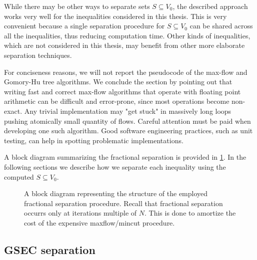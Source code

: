 While there may be other ways to separate sets $S \subseteq V_0$, the described approach works very well for the inequalities considered in this thesis.
This is very convenient because a single separation procedure for $S \subseteq V_0$ can be shared across all the inequalities, thus reducing computation time.
Other kinds of inequalities, which are not considered in this thesis, may benefit from other more elaborate separation techniques.

For conciseness reasons, we will not report the pseudocode of
the max-flow and Gomory-Hu tree algorithms.
We conclude the section by pointing out that writing fast and correct max-flow algorithms that operate with floating point arithmetic can be difficult and error-prone, since most operations become non-exact.
Any trivial implementation may "get stuck" in massively long loops pushing atomically small quantity of flows.
Careful attention must be paid when developing one such algorithm.
Good software engineering practices, such as unit testing, can help in spotting problematic implementations.

A block diagram summarizing the fractional separation is provided in \cref{fig:fractional-separation-block-diagram}.
In the following sections we describe how we separate each inequality using the computed $S \subseteq V_0$.

\begin{figure}[ht]
	\centering
	\caption{A block diagram representing the structure of the employed fractional separation procedure. Recall that fractional separation occurrs only at iterations multiple of $N$. This is done to amortize the cost of the expensive maxflow/mincut procedure.}
	\label{fig:fractional-separation-block-diagram}
\end{figure}

\subsection{GSEC separation}
\label{sec:impl-gsec-separation}

